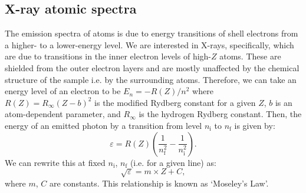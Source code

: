 \documentclass[11pt,a4paper,twoside,onecolumn]{article}
\newcommand{\rydberg}{R}
\begin{document}
\subsection{X-ray atomic spectra}
The emission spectra of atoms is due to energy transitions of shell electrons from a higher- to a lower-energy level. We are interested in X-rays, specifically, which are due to transitions in the inner electron levels of high-$Z$ atoms. These are shielded from the outer electron layers and are mostly unaffected by the chemical structure of the sample i.e. by the surrounding atoms. Therefore, we can take an energy level of an electron to be $E_n = -\rydberg\left(Z\right) / n^2$ where $\rydberg \left(Z\right)= \rydberg_\infty \left(Z - b\right)^2$ is the modified Rydberg constant for a given $Z$, $b$ is an atom-dependent parameter, and $\rydberg_\infty$ is the hydrogen Rydberg constant. Then, the energy of an emitted photon by a transition from level $n_\mathrm{i}$ to $n_\mathrm{f}$ is given by:
\begin{equation}\label{eqn:x-ray-energy}
    \varepsilon = \rydberg\left(Z\right) \left(\frac{1}{n_\mathrm{f}^2} - \frac{1}{n_\mathrm{i}^2}\right).
\end{equation}
We can rewrite this at fixed $n_\mathrm{i}$, $n_\mathrm{f}$ (i.e. for a given line) as:
\begin{equation}
    \sqrt{\varepsilon} = m \times Z + C,
\end{equation}  where $m$, $C$ are constants. This relationship is known as `Moseley's Law'.
\end{document}

